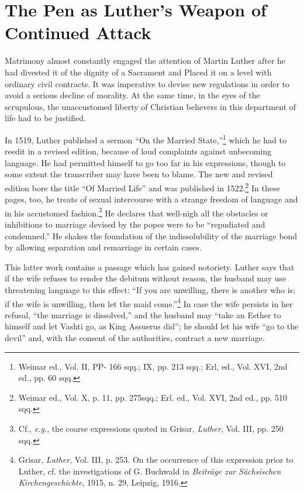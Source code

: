 \section{The Pen as Luther’s Weapon of Continued Attack}

Matrimony almost constantly engaged the attention of Martin
Luther after he had divested it of the dignity of a Sacrament and
Placed it on a level with ordinary civil contracts. It was imperative
to devise new regulations in order to avoid a serious decline of
morality. At the same time, in the eyes of the scrupulous, the unaccustomed
liberty of Christian believers in this department of life
had to be justified.

In 1519, Luther published a sermon “On the Married State,”\footnote
{Weimar ed., Vol. II, PP- 166 sqq.; IX, pp. 213 sqq.; Erl, ed., Vol. XVI, 2nd ed., pp.
60 sqq.}
which he had to reedit in a revised edition, because of loud complaints
against unbecoming language. He had permitted himself
to go too far in his expressions, though to some extent the transcriber
may have been to blame. The new and revised edition bore the title
“Of Married Life” and was published in 1522.\footnote
{Weimar ed., Vol. X, p. 11, pp. 275sqq.; Erl. ed., Vol. XVI, 2nd ed., pp. 510 sqq.}
In these pages,
too, he treats of sexual intercourse with a strange freedom of language
and in his accustomed fashion.\footnote
{Cf., \textit{e.g.}, the coarse expressions quoted in Grisar, \textit{Luther}, Vol. III, pp. 250 sqq.}
He declares that well-nigh all the
obstacles or inhibitions to marriage devised by the popes were to
be “repudiated and condemned.” He shakes the foundation of the
indissolubility of the marriage bond by allowing separation and remarriage
in certain cases.

This latter work contains a passage which has gained notoriety. Luther
says that if the wife refuses to render the debitum without reason, the
husband may use threatening language to this effect: “If you are unwilling,
there is another who is; if the wife is unwilling, then let the maid come.”\footnote
{Grisar, \textit{Luther}, Vol. III, p. 253. On the occurrence of this expression prior to Luther,
cf. the investigations of G. Buchwald in \textit{Beiträge zur Sächsischen Kirchengeschichte}, 1915,
n. 29, Leipzig, 1916.}
In case the wife persists in her refusal, “the marriage is dissolved,” and the
husband may “take an Esther to himself and let Vashti go, as King Assuerus
did”; he should let his wife “go to the devil” and, with the consent of the
authorities, contract a new marriage.


